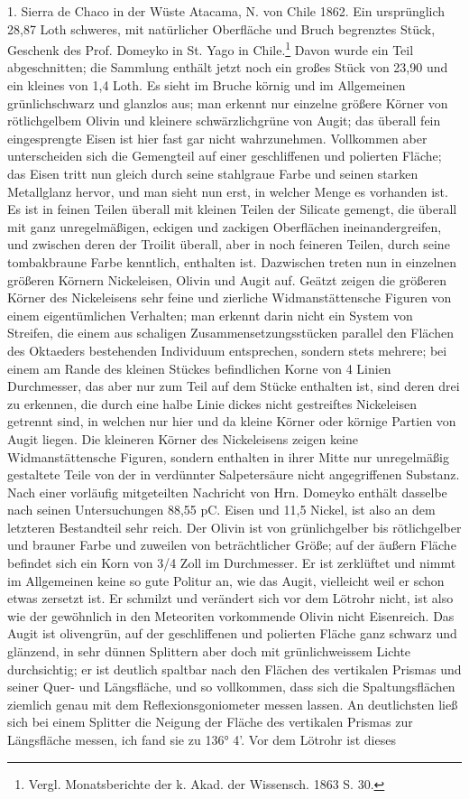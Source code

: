 \documentclass[a4paper, 11pt, oneside]{article}
\begin{document}
1. Sierra de Chaco in der Wüste Atacama, N. von Chile 1862. Ein ursprünglich 28,87 Loth schweres, mit natürlicher Oberfläche und Bruch begrenztes Stück, Geschenk des Prof. Domeyko in St. Yago in Chile.\footnote{Vergl. Monatsberichte der k. Akad. der Wissensch. 1863 S. 30.} Davon wurde ein Teil abgeschnitten; die Sammlung enthält jetzt noch ein großes Stück von 23,90 und ein kleines von 1,4 Loth. Es sieht im Bruche körnig und im Allgemeinen grünlichschwarz und glanzlos aus; man erkennt nur einzelne größere Körner von rötlichgelbem Olivin und kleinere schwärzlichgrüne von Augit; das überall fein eingesprengte Eisen ist hier fast gar nicht wahrzunehmen. Vollkommen aber unterscheiden sich die Gemengteil auf einer geschliffenen und polierten Fläche; das Eisen tritt nun gleich durch seine stahlgraue Farbe und seinen starken Metallglanz hervor, und man sieht nun erst, in welcher Menge es vorhanden ist. Es ist in feinen Teilen überall mit kleinen Teilen der Silicate gemengt, die überall mit ganz unregelmäßigen, eckigen und zackigen Oberflächen ineinandergreifen, und zwischen deren der Troilit überall, aber in noch feineren Teilen, durch seine tombakbraune Farbe kenntlich, enthalten ist. Dazwischen treten nun in einzelnen größeren Körnern Nickeleisen, Olivin und Augit auf. Geätzt zeigen die größeren Körner des Nickeleisens sehr feine und zierliche Widmanstättensche Figuren von einem eigentümlichen Verhalten; man erkennt darin nicht ein System von Streifen, die einem aus schaligen Zusammensetzungsstücken parallel den Flächen des Oktaeders bestehenden Individuum entsprechen, sondern stets mehrere; bei einem am Rande des kleinen Stückes befindlichen Korne von 4 Linien Durchmesser, das aber nur zum Teil auf dem Stücke enthalten ist, sind deren drei zu erkennen, die durch eine halbe Linie dickes nicht gestreiftes Nickeleisen getrennt sind, in welchen nur hier und da kleine Körner oder körnige Partien von Augit liegen. Die kleineren Körner des Nickeleisens zeigen keine Widmanstättensche Figuren, sondern enthalten in ihrer Mitte nur unregelmäßig gestaltete Teile von der in verdünnter Salpetersäure nicht angegriffenen Substanz. Nach einer vorläufig mitgeteilten Nachricht von Hrn. Domeyko enthält dasselbe nach seinen Untersuchungen 88,55 pC. Eisen und 11,5 Nickel, ist also an dem letzteren Bestandteil sehr reich. Der Olivin ist von grünlichgelber bis rötlichgelber und brauner Farbe und zuweilen von beträchtlicher Größe; auf der äußern Fläche befindet sich ein Korn von 3/4 Zoll im Durchmesser. Er ist zerklüftet und nimmt im Allgemeinen keine so gute Politur an, wie das Augit, vielleicht weil er schon etwas zersetzt ist. Er schmilzt und verändert sich vor dem Lötrohr nicht, ist also wie der gewöhnlich in den Meteoriten vorkommende Olivin nicht Eisenreich. Das Augit ist olivengrün, auf der geschliffenen und polierten Fläche ganz schwarz und glänzend, in sehr dünnen Splittern aber doch mit grünlichweissem Lichte durchsichtig; er ist deutlich spaltbar nach den Flächen des vertikalen Prismas und seiner Quer- und Längsfläche, und so vollkommen, dass sich die Spaltungsflächen ziemlich genau mit dem Reflexionsgoniometer messen lassen. An deutlichsten ließ sich bei einem Splitter die Neigung der Fläche des vertikalen Prismas zur Längsfläche messen, ich fand sie zu 136° 4’. Vor dem Lötrohr ist dieses 
\end{document}
